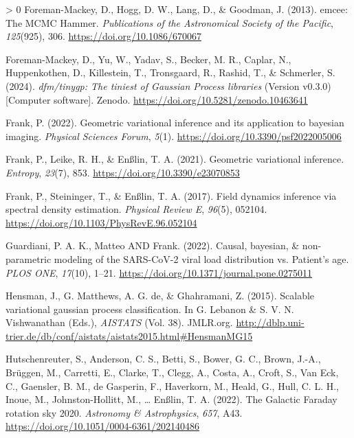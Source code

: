 \documentclass[10pt,a4paper,onecolumn]{article}
\newlength{\cslhangindent}
\newenvironment{CSLReferences}[3] %
 {%
  \setlength{\parindent}{0pt}
  \ifodd #1 \everypar{\setlength{\hangindent}{\cslhangindent}}\ignorespaces\fi
  \ifnum #2 > 0
  \setlength{\parskip}{#2\baselineskip}
  \fi
 }%
 {}
\begin{document}
\begin{CSLReferences}{1}{0}
\leavevmode\hypertarget{ref-ForemanMackey2013}{}%
Foreman-Mackey, D., Hogg, D. W., Lang, D., \& Goodman, J. (2013).
{emcee: The MCMC Hammer}. \emph{Publications of the Astronomical Society
of the Pacific}, \emph{125}(925), 306.
\url{https://doi.org/10.1086/670067}

\leavevmode\hypertarget{ref-ForemanMackey2024}{}%
Foreman-Mackey, D., Yu, W., Yadav, S., Becker, M. R., Caplar, N.,
Huppenkothen, D., Killestein, T., Tronsgaard, R., Rashid, T., \&
Schmerler, S. (2024). \emph{{dfm/tinygp: The tiniest of Gaussian Process
libraries}} (Version v0.3.0) {[}Computer software{]}. Zenodo.
\url{https://doi.org/10.5281/zenodo.10463641}

\leavevmode\hypertarget{ref-Frank2022}{}%
Frank, P. (2022). Geometric variational inference and its application to
bayesian imaging. \emph{Physical Sciences Forum}, \emph{5}(1).
\url{https://doi.org/10.3390/psf2022005006}

\leavevmode\hypertarget{ref-Frank2021}{}%
Frank, P., Leike, R. H., \& Enßlin, T. A. (2021). Geometric variational
inference. \emph{Entropy}, \emph{23}(7), 853.
\url{https://doi.org/10.3390/e23070853}

\leavevmode\hypertarget{ref-Frank2017}{}%
Frank, P., Steininger, T., \& Enßlin, T. A. (2017). {Field dynamics
inference via spectral density estimation}. \emph{Physical Review E},
\emph{96}(5), 052104. \url{https://doi.org/10.1103/PhysRevE.96.052104}

\leavevmode\hypertarget{ref-Guardiani2022}{}%
Guardiani, P. A. K., Matteo AND Frank. (2022). Causal, bayesian, \&
non-parametric modeling of the SARS-CoV-2 viral load distribution vs.
Patient's age. \emph{PLOS ONE}, \emph{17}(10), 1--21.
\url{https://doi.org/10.1371/journal.pone.0275011}

\leavevmode\hypertarget{ref-Hensman2015}{}%
Hensman, J., G. Matthews, A. G. de, \& Ghahramani, Z. (2015). Scalable
variational gaussian process classification. In G. Lebanon \& S. V. N.
Vishwanathan (Eds.), \emph{AISTATS} (Vol. 38). JMLR.org.
\url{http://dblp.uni-trier.de/db/conf/aistats/aistats2015.html\#HensmanMG15}

\leavevmode\hypertarget{ref-Hutschenreuter2022}{}%
Hutschenreuter, S., Anderson, C. S., Betti, S., Bower, G. C., Brown,
J.-A., Brüggen, M., Carretti, E., Clarke, T., Clegg, A., Costa, A.,
Croft, S., Van Eck, C., Gaensler, B. M., de Gasperin, F., Haverkorn, M.,
Heald, G., Hull, C. L. H., Inoue, M., Johnston-Hollitt, M., \ldots{}
Enßlin, T. A. (2022). {The Galactic Faraday rotation sky 2020}.
\emph{Astronomy \& Astrophysics}, \emph{657}, A43.
\url{https://doi.org/10.1051/0004-6361/202140486}


\end{CSLReferences}
\end{document}
